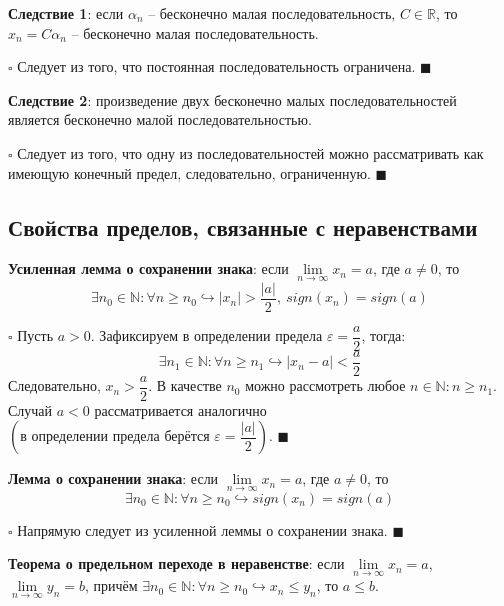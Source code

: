 \documentclass[12pt, a4paper, reqno]{article}
\begin{document}
    \textbf{Следствие 1}: если $\alpha_n$ -- бесконечно малая последовательность, $C\in\mathbb{R}$,
    то $x_n = C\alpha_n$ -- бесконечно малая последовательность.

    $\square$ Следует из того, что постоянная последовательность ограничена. $\blacksquare$

    \textbf{Следствие 2}: произведение двух бесконечно малых последовательностей является бесконечно
    малой последовательностью.

    $\square$ Следует из того, что одну из последовательностей можно рассматривать как имеющую
    конечный предел, следовательно, ограниченную. $\blacksquare$

\subsection{Свойства пределов, связанные с неравенствами}

    \textbf{Усиленная лемма о сохранении знака}: если $\lim\limits_{n\to\infty} x_n = a$, где
    $a \neq 0$, то
    \begin{equation*}
    \exists n_0\in\mathbb{N}: \forall n \geq n_0 \hookrightarrow |x_n| > \dfrac{|a|}{2},\
    sign(x_n) = sign(a)
    \end{equation*}

    $\square$ Пусть $a > 0$. Зафиксируем в определении предела $\varepsilon = \dfrac{a}{2}$, тогда:
    \begin{equation*}
        \exists n_1\in\mathbb{N}: \forall n \geq n_1 \hookrightarrow |x_n - a| < \dfrac{a}{2}
    \end{equation*}
    Следовательно, $x_n > \dfrac{a}{2}$. В качестве $n_0$ можно рассмотреть любое $n\in\mathbb{N}:
    n \geq n_1$. Случай $a < 0$ рассматривается аналогично $\left(\text{в определении предела берётся }
    \varepsilon = \dfrac{|a|}{2}\right)$. $\blacksquare$

    \textbf{Лемма о сохранении знака}: если $\lim\limits_{n\to\infty} x_n = a$, где $a \neq 0$, то
    \begin{equation*}
        \exists n_0\in\mathbb{N}: \forall n \geq n_0 \hookrightarrow sign(x_n) = sign(a)
    \end{equation*}

    $\square$ Напрямую следует из усиленной леммы о сохранении знака. $\blacksquare$

    \textbf{Теорема о предельном переходе в неравенстве}: если $\lim\limits_{n\to\infty} x_n = a$,
    $\lim\limits_{n\to\infty} y_n = b$, причём $\exists n_0\in\mathbb{N}: \forall n \geq n_0
    \hookrightarrow x_n \leq y_n$, то $a \leq b$.
\end{document}
